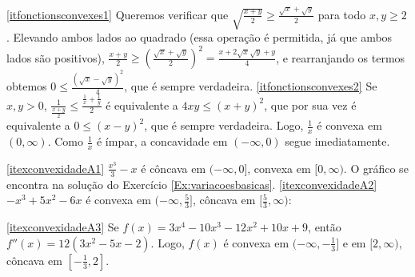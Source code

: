 \begin{Solution}{6.47}
\eqref{itfonctionsconvexes1} Queremos verificar que $\sqrt{\frac{x+y}{2}}\geq
\frac{\sqrt{x}+\sqrt{y}}{2}$ para todo $x,y\geq 2$.
Elevando ambos lados ao quadrado (essa operação é permitida, já que ambos
lados são positivos), $\frac{x+y}{2}\geq
(\frac{\sqrt{x}+\sqrt{y}}{2})^2
=\frac{x+2\sqrt{x}\sqrt{y}+y}{4}$, e rearranjando os termos obtemos $0\leq
\frac{(\sqrt{x}-\sqrt{y})^2}{4}$, que é sempre verdadeira.
\eqref{itfonctionsconvexes2}
Se $x,y>0$, $\frac{1}{\frac{x+y}{2}}\leq \frac{\frac{1}{x}+\frac{1}{y}}{2}$ é
equivalente a $4xy\leq (x+y)^2$, que por sua vez é equivalente a $0\leq
(x-y)^2$, que é sempre verdadeira. Logo, $\frac1x$ é convexa em $(0,\infty)$.
Como $\frac1x$ é ímpar, a concavidade em $(-\infty,0)$ segue imediatamente.
\end{Solution}
\begin{Solution}{6.48}
\eqref{itexconvexidadeA1}
$\frac{x^3}{3}-x$ é côncava em $(-\infty,0]$, convexa em $[0,\infty)$.
O gráfico se encontra na solução do Exercício \ref{Ex:variacoesbasicas}.
\eqref{itexconvexidadeA2} $-x^3+5x^2-6x$ é convexa em $(-\infty,\tfrac53]$,
côncava em $[\frac53,\infty)$:
\begin{center}
\begin{bmlimage}\end{bmlimage}
\end{center}
\eqref{itexconvexidadeA3} Se $f(x)=3x^4-10x^3-12x^2+10x+9$, então
$f''(x)=12(3x^2-5x-2)$.
Logo, $f(x)$ é convexa em $(-\infty,-\tfrac13]$ e em $[2,\infty)$,
côncava em $[-\tfrac13,2]$.
\begin{center}
\begin{bmlimage}
\end{bmlimage}
\end{center}
\end{Solution}

